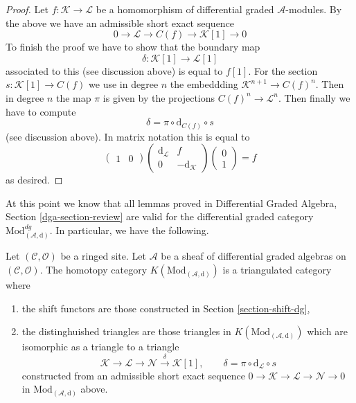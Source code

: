 \begin{proof}
Let $f : \mathcal{K} \to \mathcal{L}$
be a homomorphism of differential graded $\mathcal{A}$-modules.
By the above we have an admissible short exact sequence
$$
0 \to \mathcal{L} \to C(f) \to \mathcal{K}[1] \to 0
$$
To finish the proof we have to show that the boundary map
$$
\delta : \mathcal{K}[1] \to \mathcal{L}[1]
$$
associated to this (see discussion above) is equal to $f[1]$.
For the section $s : \mathcal{K}[1] \to C(f)$ we use in degree
$n$ the embeddding $\mathcal{K}^{n + 1} \to C(f)^n$. Then
in degree $n$ the map $\pi$ is given by the projections
$C(f)^n \to \mathcal{L}^n$. Then finally we have to compute
$$
\delta = \pi \circ \text{d}_{C(f)} \circ s
$$
(see discussion above). In matrix notation this is equal to
$$
\left(
\begin{matrix}
1 & 0
\end{matrix}
\right)
\left(
\begin{matrix}
\text{d}_\mathcal{L} & f \\
0 & -\text{d}_\mathcal{K}
\end{matrix}
\right)
\left(
\begin{matrix}
0 \\
1
\end{matrix}
\right) = f
$$
as desired.
\end{proof}

\noindent
At this point we know that all lemmas proved in
Differential Graded Algebra, Section \ref{dga-section-review}
are valid for the differential graded category
$\text{Mod}^{dg}_{(\mathcal{A}, \text{d})}$.
In particular, we have the following.

\begin{proposition}
\label{proposition-homotopy-category-triangulated}
Let $(\mathcal{C}, \mathcal{O})$ be a ringed site.
Let $\mathcal{A}$ be a sheaf of differential graded algebras
on $(\mathcal{C}, \mathcal{O})$.
The homotopy category $K(\text{Mod}_{(\mathcal{A}, \text{d})})$
is a triangulated category where
\begin{enumerate}
\item the shift functors are those constructed in
Section \ref{section-shift-dg},
\item the distinghuished triangles are those triangles
in $K(\text{Mod}_{(\mathcal{A}, \text{d})})$ which are
isomorphic as a triangle to a triangle
$$
\mathcal{K} \to \mathcal{L} \to \mathcal{N}
\xrightarrow{\delta} \mathcal{K}[1],\quad\quad
\delta = \pi \circ \text{d}_\mathcal{L} \circ s
$$
constructed from an admissible short exact sequence
$0 \to \mathcal{K} \to \mathcal{L} \to \mathcal{N} \to 0$
in $\text{Mod}_{(\mathcal{A}, \text{d})}$ above.
\end{enumerate}
\end{proposition}

